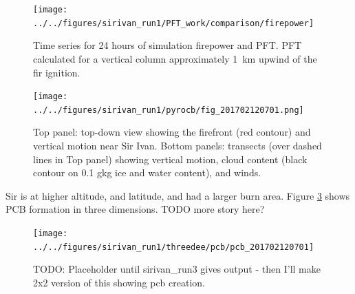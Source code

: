     \begin{figure}
      \centering
      \texttt{[image: ../../figures/sirivan\_run1/PFT\_work/comparison/firepower]}
      \caption{%
        Time series for 24 hours of simulation firepower and PFT.
        PFT calculated for a vertical column approximately 1~km upwind of the fir ignition.
        }
      \label{fig:pcb:sirivan:pft_series}
    \end{figure}


    \begin{figure}
      \centering
      \texttt{[image: ../../figures/sirivan\_run1/pyrocb/fig\_201702120701.png]}
      \caption{%
        Top panel: top-down view showing the firefront (red contour) and vertical motion near Sir Ivan.
        Bottom panels: transects (over dashed lines in Top panel) showing vertical motion, cloud content (black contour on 0.1 g\/kg ice and water content), and winds.
        }
      \label{fig:pcb:sirivan:pcb_transects}
    \end{figure}
    
    Sir is at higher altitude, and latitude, and had a larger burn area.
    Figure \ref{fig:pcb:sirivan_pcb_3d} shows PCB formation in three dimensions.
    TODO more story here?
    
    \begin{figure}
      \centering
      \texttt{[image: ../../figures/sirivan\_run1/threedee/pcb/pcb\_201702120701]}
      \caption{%
        TODO: Placeholder until sirivan\_run3 gives output - then I'll make 2x2 version of this showing pcb creation.
        }
      \label{fig:pcb:sirivan_pcb_3d}
    \end{figure}
